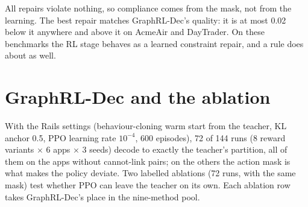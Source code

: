 \documentclass[10pt,a4paper]{article}
\begin{document}
All repairs violate nothing, so compliance comes from the mask, not from the learning. The best repair matches GraphRL-Dec's quality: it is at most 0.02 below it anywhere and above it on AcmeAir and DayTrader. On these benchmarks the RL stage behaves as a learned constraint repair, and a rule does about as well.
\section{GraphRL-Dec and the ablation}
With the Rails settings (behaviour-cloning warm start from the teacher, KL anchor 0.5, PPO learning rate $10^{-4}$, 600 episodes), 72 of 144 runs (8 reward variants $\times$ 6 apps $\times$ 3 seeds) decode to exactly the teacher's partition, all of them on the apps without cannot-link pairs; on the others the action mask is what makes the policy deviate. Two labelled ablations (72 runs, with the same mask) test whether PPO can leave the teacher on its own. Each ablation row takes GraphRL-Dec's place in the nine-method pool.
\end{document}
